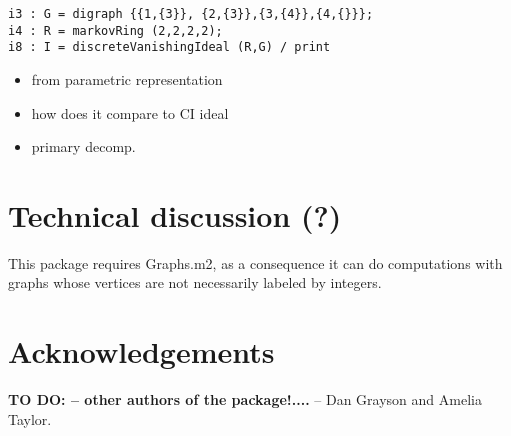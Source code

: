 \documentclass[letterpaper]{article}
\theoremstyle{definition}
\begin{document}
\begin{verbatim}
i3 : G = digraph {{1,{3}}, {2,{3}},{3,{4}},{4,{}}};
i4 : R = markovRing (2,2,2,2);
i8 : I = discreteVanishingIdeal (R,G) / print

\end{verbatim}


\begin{itemize}
\item from parametric representation
\item how does it compare to CI ideal
\item primary decomp.
\end{itemize}




\section{Technical discussion (?) }
This package requires Graphs.m2, as a consequence it can do
computations with graphs whose vertices are not necessarily labeled by
integers. 


\section*{Acknowledgements} {\bf TO DO: -- other authors of the package!....} -- Dan Grayson and Amelia Taylor.
\end{document}
